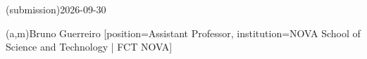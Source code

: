 %
%
\ntdate(submission){2026-09-30}



%
%
%
%
%
%
(a,m){Bruno Guerreiro}
  [position=Assistant Professor, institution=NOVA School of Science and Technology | FCT NOVA]



